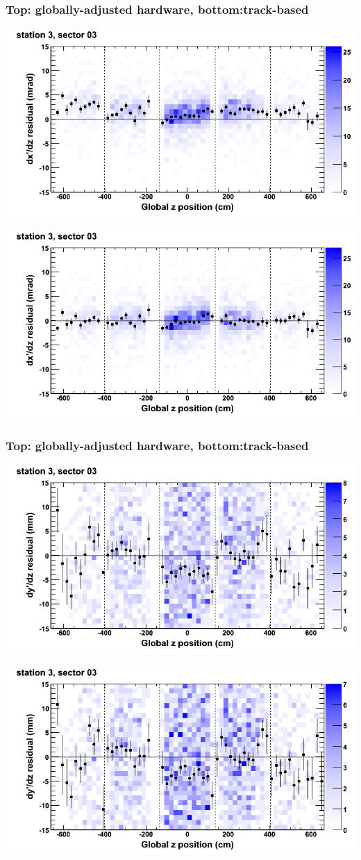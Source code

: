 \documentclass[compress]{beamer}
\begin{document}
\begin{frame}
\frametitle{Top: globally-adjusted hardware, bottom:track-based}
\includegraphics[width=0.7\linewidth]{NOV4_mapplots_HW/DTvsz_st3sec03_dxdz.png}

\includegraphics[width=0.7\linewidth]{NOV4_mapplots/DTvsz_st3sec03_dxdz.png}
\end{frame}

\begin{frame}
\frametitle{Top: globally-adjusted hardware, bottom:track-based}
\includegraphics[width=0.7\linewidth]{NOV4_mapplots_HW/DTvsz_st3sec03_dydz.png}

\includegraphics[width=0.7\linewidth]{NOV4_mapplots/DTvsz_st3sec03_dydz.png}
\end{frame}
\end{document}
